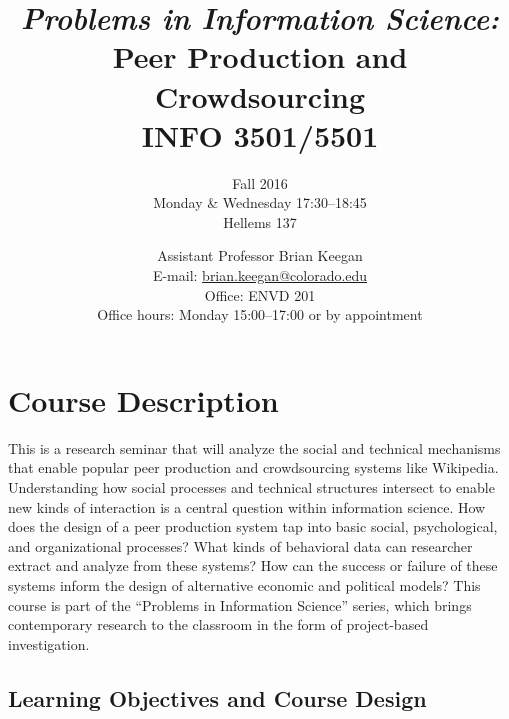 \documentclass[10pt]{memoir}
\makeatletter
\def\myauthor{Brian Keegan}
\def\mycoursename{Peer Production and Crowdsourcing}
\def\mycourselisting{INFO 3501/5501}
\def\myoffice{ENVD 201}
\def\myclassroom{Hellems 137}
\def\mymeetingtime{Monday \& Wednesday 17:30--18:45}
\def\mydate{Fall 2016}
\def\myemail{brian.keegan@colorado.edu}
\def\myofficehours{Monday 15:00--17:00 or by appointment}
\def\mytitle{Assistant Professor }
\makeatother
\begin{document}
\nobibliography*


\title{
    \textit{\normalsize{\textcolor{CUGold}{\textbf{Problems in Information Science:}}}}\\
    \textbf{\huge{\mycoursename}}\\
    \vspace{5pt} \normalsize{\mycourselisting}
    }

\author{\mydate\\ \mymeetingtime\\ \myclassroom}

\date{\normalsize{\mytitle \myauthor\\
       E-mail: \href{mailto:\myemail}{\myemail}\\
       Office: \myoffice\\
       Office hours: \myofficehours}}

\maketitle


\section{\textbf{Course Description}}

This is a research seminar that will analyze the social and technical mechanisms that enable popular peer production and crowdsourcing systems like Wikipedia. Understanding how social processes and technical structures intersect to enable new kinds of interaction is a central question within information science. How does the design of a peer production system tap into basic social, psychological, and organizational processes? What kinds of behavioral data can researcher extract and analyze from these systems? How can the success or failure of these systems inform the design of alternative economic and political models? This course is part of the ``Problems in Information Science'' series, which brings contemporary research to the classroom in the form of project-based investigation.

\subsection{Learning Objectives and Course Design}
\end{document}

